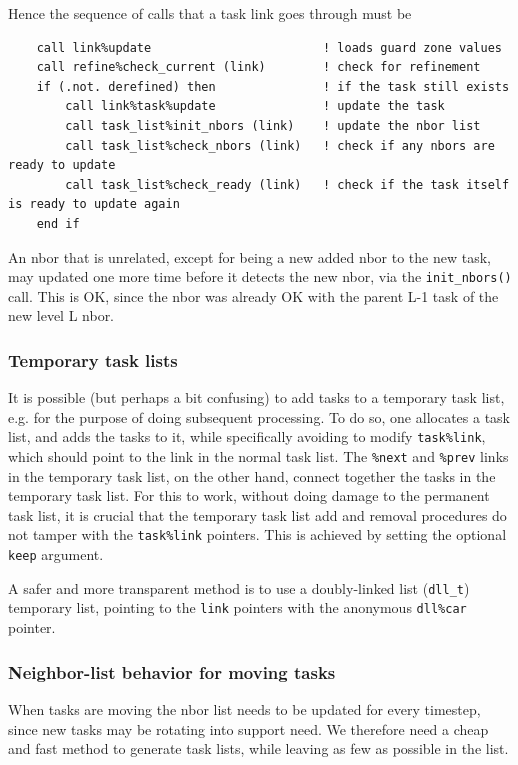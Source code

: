 \documentclass[paper=a4,fontsize=11pt]{scrartcl}
\numberwithin{equation}{section}		%
\numberwithin{figure}{section}			%
\numberwithin{table}{section}				%
\newcommand{\codecolor}{\color{Blue}}
\newcommand{\Code}[1]{{\codecolor\texttt{#1}}}
\def\initnbors{\Code{init\_nbors()}}
\begin{document}
Hence the sequence of calls that a task link goes through must be 
{\codecolor
\begin{verbatim}
    call link%update                        ! loads guard zone values
    call refine%check_current (link)        ! check for refinement
    if (.not. derefined) then               ! if the task still exists
        call link%task%update               ! update the task
        call task_list%init_nbors (link)    ! update the nbor list
        call task_list%check_nbors (link)   ! check if any nbors are ready to update
        call task_list%check_ready (link)   ! check if the task itself is ready to update again
    end if
\end{verbatim}}
An nbor that is unrelated, except for being a new added nbor to the new task, may updated one more time before it detects the new nbor, via the {\initnbors} call.  This is OK, since the nbor was already OK with the parent L-1 task of the new level L nbor.

\subsubsection{Temporary task lists}
It is possible (but perhaps a bit confusing) to add tasks to a temporary task list, e.g. for the purpose of doing subsequent processing.  To do so, one allocates a task list, and adds the tasks to it, while specifically avoiding to modify \Code{task\%link}, which should point to the link in the normal task list.  The \Code{\%next} and \Code{\%prev} links in the temporary task list, on the other hand, connect together the tasks in the temporary task list. For this to work, without doing damage to the permanent task list, it is crucial that the temporary task list add and removal procedures do not tamper with the \Code{task\%link} pointers. This is achieved by setting the optional \Code{keep} argument.

A safer and more transparent method is to use a doubly-linked list (\Code{dll\_t}) temporary list, pointing to the \Code{link} pointers with the anonymous \Code{dll\%car} pointer.

\subsubsection{Neighbor-list behavior for moving tasks}
When tasks are moving the nbor list needs to be updated for every timestep, since new tasks may be rotating into support need.  We therefore need a cheap and fast method to generate task lists, while leaving as few as possible in the list.
\end{document}
